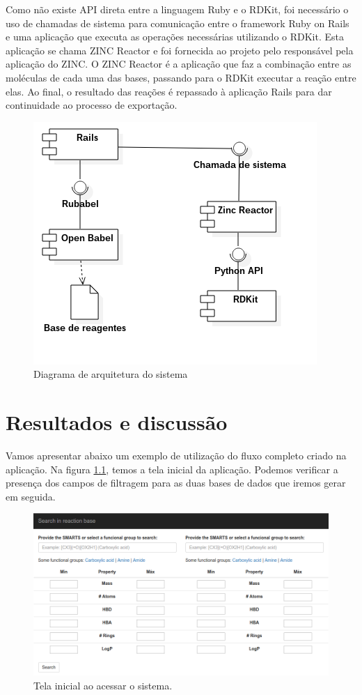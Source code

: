 \documentclass{abnt}
\begin{document}
Como não existe API direta entre a linguagem Ruby e o RDKit, foi necessário o uso
de chamadas de sistema para comunicação entre o framework Ruby on Rails e uma aplicação
que executa as operações necessárias utilizando o RDKit. Esta aplicação se chama
ZINC Reactor e foi fornecida ao projeto pelo responsável pela aplicação do ZINC.
O ZINC Reactor é a aplicação que faz a combinação entre as moléculas de cada uma
das bases, passando para o RDKit executar a reação entre elas. Ao final, o resultado
das reações é repassado à aplicação Rails para dar continuidade ao processo de exportação.

\begin{figure}[!htb]
  \centering
  \includegraphics[scale=0.8]{diagrama_de_arquitetura.png}
  \caption{Diagrama de arquitetura do sistema}
  \label{fig:arq}
\end{figure}

\chapter{Resultados e discussão}

Vamos apresentar abaixo um exemplo de utilização do fluxo completo criado na
aplicação. Na figura \ref{fig:react1}, temos a tela inicial da aplicação. Podemos
verificar a presença dos campos de filtragem para as duas bases de dados que iremos
gerar em seguida.

\begin{figure}[!htb]
  \centering
  \includegraphics[scale=0.5]{reaction1}
  \caption{Tela inicial ao acessar o sistema.}
  \label{fig:react1}
\end{figure}
\end{document}

